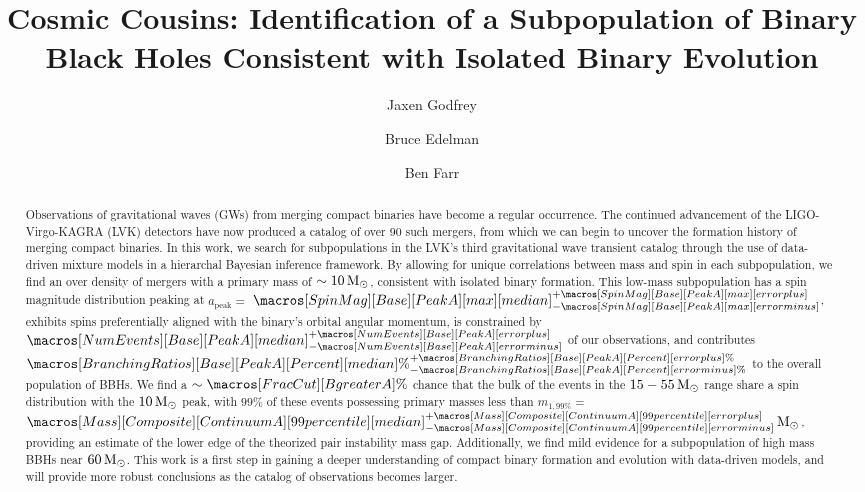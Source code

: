 \documentclass[twocolumn]{aastex631}
\newcommand{\CIPlusMinus}[1]{{#1[median]^{+#1[error plus]}_{-#1[error minus]}}}
\newcommand{\CIPlusMinusPer}[1]{{#1[median]\%^{+#1[error plus]\%}_{-#1[error minus]\%}}}
\newcommand{\msun}{\ensuremath{{\,\rm M}_\odot}}
\newcommand{\result}[1]{\textcolor{BurntOrange}{#1}}
\begin{document}
\title{Cosmic Cousins: Identification of a Subpopulation of Binary Black Holes Consistent with Isolated Binary Evolution}

\author{Jaxen Godfrey}
\author{Bruce Edelman}
\author{Ben Farr}

\begin{abstract}
    Observations of gravitational waves (GWs) from merging compact binaries have become a regular occurrence. The continued advancement of the LIGO-Virgo-KAGRA (LVK) detectors have now produced a catalog of over 90 such mergers, from which we can begin to uncover the formation history of merging compact binaries. In this work, we search for subpopulations in the LVK's third gravitational wave transient catalog through the use of data-driven mixture models in a hierarchal Bayesian inference framework. By allowing for unique correlations between mass and spin in each subpopulation, we find an over density of mergers with a primary mass of $\sim10\msun$, consistent with isolated binary formation. This low-mass subpopulation has a spin magnitude distribution peaking at $a_\mathrm{peak}=$ \result{$\CIPlusMinus{\macros[SpinMag][Base][PeakA][max]}$}, exhibits spins preferentially aligned with the binary's orbital angular momentum, is constrained by \result{$\CIPlusMinus{\macros[NumEvents][Base][PeakA]}$} of our observations, and contributes \result{$\CIPlusMinusPer{\macros[BranchingRatios][Base][PeakA][Percent]}$} to the overall population of BBHs. We find a $\sim\macros[FracCut][BgreaterA]\%$ chance that the bulk of the events in the $15-55\msun$ range share a spin distribution with the $10\msun$ peak, with $99\%$ of these events possessing primary masses less than $m_{1,99\%} = $ \result{$\CIPlusMinus{\macros[Mass][Composite][ContinuumA][99percentile]}\msun$}, providing an estimate of the lower edge of the theorized pair instability mass gap. Additionally, we find mild evidence for a subpopulation of high mass BBHs near $60\msun$. This work is a first step in gaining a deeper understanding of compact binary formation and evolution with data-driven models, and will provide more robust conclusions as the catalog of observations becomes larger. 
\end{abstract}
\end{document}
